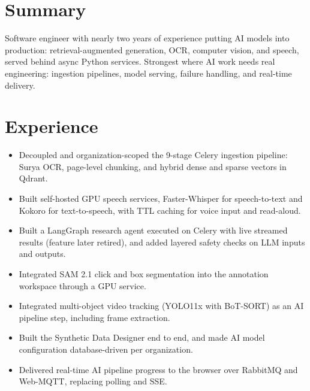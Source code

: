 \documentclass[10pt,a4paper]{article}
\begin{document}

\section{Summary}
Software engineer with nearly two years of experience putting AI models into production: retrieval-augmented generation, OCR, computer vision, and speech, served behind async Python services. Strongest where AI work needs real engineering: ingestion pipelines, model serving, failure handling, and real-time delivery.

\section{Experience}

\begin{itemize}
  \item Decoupled and organization-scoped the 9-stage Celery ingestion pipeline: Surya OCR, page-level chunking, and hybrid dense and sparse vectors in Qdrant.
  \item Built self-hosted GPU speech services, Faster-Whisper for speech-to-text and Kokoro for text-to-speech, with TTL caching for voice input and read-aloud.
  \item Built a LangGraph research agent executed on Celery with live streamed results (feature later retired), and added layered safety checks on LLM inputs and outputs.
\end{itemize}

\begin{itemize}
  \item Integrated SAM 2.1 click and box segmentation into the annotation workspace through a GPU service.
  \item Integrated multi-object video tracking (YOLO11x with BoT-SORT) as an AI pipeline step, including frame extraction.
  \item Built the Synthetic Data Designer end to end, and made AI model configuration database-driven per organization.
  \item Delivered real-time AI pipeline progress to the browser over RabbitMQ and Web-MQTT, replacing polling and SSE.
\end{itemize}
\end{document}
